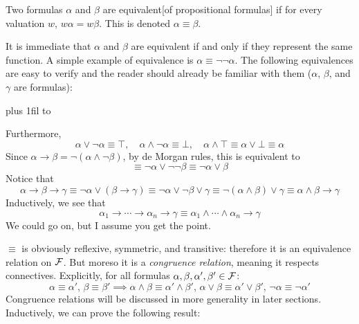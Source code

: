 \bdefn

    Two formulas $\alpha$ and $\beta$ are {\emphcolor equivalent}[of propositional formulas] if for every valuation $w$, $w\alpha=w\beta$.
    This is denoted $\alpha\equiv\beta$.

\edefn

It is immediate that $\alpha$ and $\beta$ are equivalent if and only if they represent the same function.
A simple example of equivalence is $\alpha\equiv\neg\neg\alpha$.
The following equivalences are easy to verify and the reader should already be familiar with them ($\alpha$, $\beta$, and $\gamma$ are formulas):

\medskip
{\tabskip=0pt plus 1fil
\halign to }

Furthermore,
$$ \alpha\lor\neg\alpha \equiv \top,\quad \alpha\land\neg\alpha\equiv\bot,\quad \alpha\land\top\equiv\alpha\lor\bot\equiv\alpha $$
Since $\alpha\to\beta=\neg(\alpha\land\neg\beta)$, by de Morgan rules, this is equivalent to 
$$ \equiv\neg\alpha\lor\neg\neg\beta \equiv \neg\alpha\lor\beta $$
Notice that
$$ \alpha\to\beta\to\gamma \equiv \neg\alpha\lor(\beta\to\gamma) \equiv \neg\alpha\lor\neg\beta\lor\gamma \equiv \neg(\alpha\land\beta)\lor\gamma \equiv \alpha\land\beta\to\gamma $$
Inductively, we see that
$$ \alpha_1\to\cdots\to\alpha_n\to\gamma \equiv \alpha_1\land\cdots\land\alpha_n\to\gamma $$
We could go on, but I assume you get the point.

$\equiv$ is obviously reflexive, symmetric, and transitive: therefore it is an equivalence relation on ${\cal F}$.
But moreso it is a {\it congruence relation}, meaning it respects connectives.
Explicitly, for all formulas $\alpha,\beta,\alpha',\beta'\in{\cal F}$:
$$ \alpha\equiv\alpha',\,\beta\equiv\beta' \implies \alpha\land\beta\equiv\alpha'\land\beta',\,\alpha\lor\beta\equiv\alpha'\lor\beta',\,\neg\alpha\equiv\neg\alpha' $$
Congruence relations will be discussed in more generality in later sections.
Inductively, we can prove the following result:

